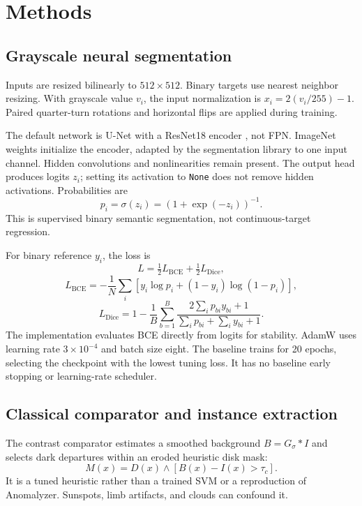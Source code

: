 \documentclass[conference]{IEEEtran}
\begin{document}
\section{Methods}
\subsection{Grayscale neural segmentation}
Inputs are resized bilinearly to $512\times512$. Binary targets use nearest
neighbor resizing. With grayscale value $v_i$, the input normalization is
$x_i=2(v_i/255)-1$. Paired quarter-turn rotations and horizontal flips are
applied during training.

The default network is U-Net with a ResNet18 encoder \cite{resnet}, not FPN.
ImageNet weights initialize the encoder, adapted by the segmentation library
to one input channel. Hidden convolutions and nonlinearities remain present.
The output head produces logits $z_i$; setting its activation to \texttt{None}
does not remove hidden activations. Probabilities are
\begin{equation}
p_i=\sigma(z_i)=(1+\exp(-z_i))^{-1}.
\end{equation}
This is supervised binary semantic segmentation, not continuous-target
regression.

For binary reference $y_i$, the loss is
\begin{equation}
L=\tfrac12 L_{\mathrm{BCE}}+\tfrac12 L_{\mathrm{Dice}},
\end{equation}
\begin{equation}
L_{\mathrm{BCE}}=-\frac{1}{N}\sum_i
[y_i\log p_i+(1-y_i)\log(1-p_i)],
\end{equation}
\begin{equation}
L_{\mathrm{Dice}}=1-\frac{1}{B}\sum_{b=1}^{B}
\frac{2\sum_i p_{bi}y_{bi}+1}{\sum_i p_{bi}+\sum_i y_{bi}+1}.
\end{equation}
The implementation evaluates BCE directly from logits for stability.
AdamW uses learning rate $3\times10^{-4}$ and batch size eight.
The baseline trains for 20 epochs, selecting the checkpoint with the lowest
tuning loss. It has no baseline early stopping or learning-rate scheduler.

\subsection{Classical comparator and instance extraction}
The contrast comparator estimates a smoothed background
$B=G_\sigma*I$ and selects dark departures within an eroded heuristic disk mask:
\begin{equation}
M(x)=D(x)\land[B(x)-I(x)>\tau_c].
\end{equation}
It is a tuned heuristic rather than a trained SVM or a reproduction of
Anomalyzer. Sunspots, limb artifacts, and clouds can confound it.
\end{document}
